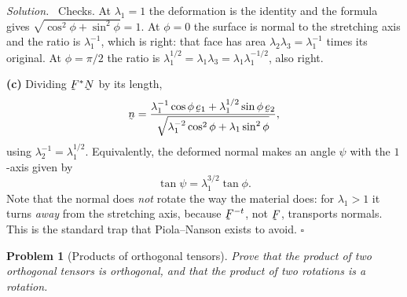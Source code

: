 \documentclass[17pt,a4paper]{extreport}
\DeclareRobustCommand{\vek}[1]{\underaccent{\tilde}{#1}}
\newcommand{\bn}{\vek{n}}
\newcommand{\bN}{\vek{N}}
\newcommand{\bF}{\vek{F}}
\newcommand{\be}{\vek{e}}
\theoremstyle{scplain}
\theoremstyle{scdefn}
\newtheorem{problem}{Problem}
\newenvironment{solution}{\par\smallskip\noindent\textit{Solution.}\ }
  {\hfill$\square$\par\smallskip}
\begin{document}
\begin{solution}
Checks. At $\lambda_{1}=1$ the deformation is the identity and the formula
gives $\sqrt{\cos^{2}\phi+\sin^{2}\phi}=1$. At $\phi=0$ the surface is
normal to the stretching axis and the ratio is $\lambda_{1}^{-1}$, which
is right: that face has area $\lambda_{2}\lambda_{3}=\lambda_{1}^{-1}$
times its original. At $\phi=\pi/2$ the ratio is $\lambda_{1}^{1/2}
=\lambda_{1}\lambda_{3}=\lambda_{1}\lambda_{1}^{-1/2}$, also right.

\textbf{(c)} Dividing $\bF^{*}\bN$ by its length,
\[
   \bn=\frac{\lambda_{1}^{-1}\cos\phi\,\be_{1}
             +\lambda_{1}^{1/2}\sin\phi\,\be_{2}}
            {\sqrt{\lambda_{1}^{-2}\cos^{2}\phi+\lambda_{1}\sin^{2}\phi}},
\]
using $\lambda_{2}^{-1}=\lambda_{1}^{1/2}$. Equivalently, the deformed
normal makes an angle $\psi$ with the $1$-axis given by
\[
   \tan\psi=\lambda_{1}^{3/2}\tan\phi .
\]
Note that the normal does \emph{not} rotate the way the material does: for
$\lambda_{1}>1$ it turns \emph{away} from the stretching axis, because
$\bF^{-t}$, not $\bF$, transports normals. This is the standard trap that
Piola--Nanson exists to avoid.
\end{solution}

\begin{problem}[Products of orthogonal tensors]
Prove that the product of two orthogonal tensors is orthogonal, and that
the product of two rotations is a rotation.
\end{problem}
\end{document}
